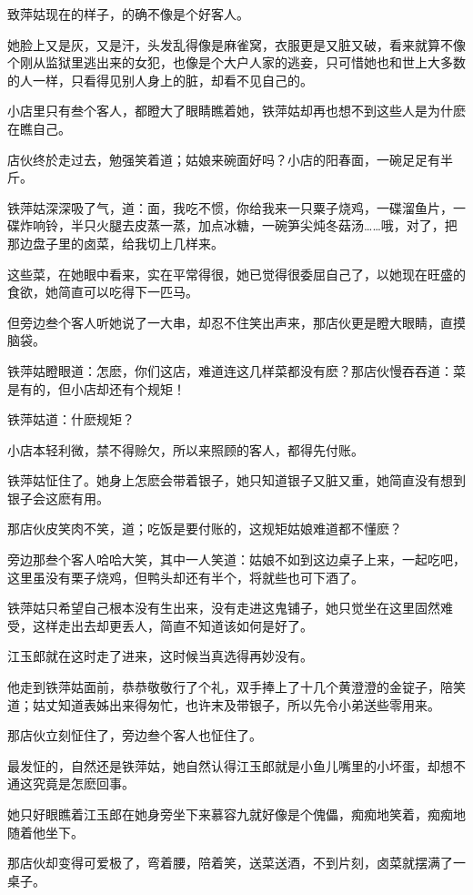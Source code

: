 \documentclass[12pt,oneside]{book}
\begin{document}
致萍姑现在的样子，的确不像是个好客人。

她脸上又是灰，又是汗，头发乱得像是麻雀窝，衣服更是又脏又破，看来就算不像个刚从监狱里逃出来的女犯，也像是个大户人家的逃妾，只可惜她也和世上大多数的人一样，只看得见别人身上的脏，却看不见自己的。

小店里只有叁个客人，都瞪大了眼睛瞧着她，铁萍姑却再也想不到这些人是为什麽在瞧自己。

店伙终於走过去，勉强笑着道；姑娘来碗面好吗？小店的阳春面，一碗足足有半斤。

铁萍姑深深吸了气，道：面，我吃不惯，你给我来一只粟子烧鸡，一碟溜鱼片，一碟炸响铃，半只火腿去皮蒸一蒸，加点冰糖，一碗笋尖炖冬菇汤\ldots\ldots 哦，对了，把那边盘子里的卤菜，给我切上几样来。

这些菜，在她眼中看来，实在平常得很，她已觉得很委屈自己了，以她现在旺盛的食欲，她简直可以吃得下一匹马。

但旁边叁个客人听她说了一大串，却忍不住笑出声来，那店伙更是瞪大眼睛，直摸脑袋。

铁萍姑瞪眼道：怎麽，你们这店，难道连这几样菜都没有麽？那店伙慢吞吞道：菜是有的，但小店却还有个规矩！

铁萍姑道：什麽规矩？

小店本轻利微，禁不得赊欠，所以来照顾的客人，都得先付账。

铁萍姑怔住了。她身上怎麽会带着银子，她只知道银子又脏又重，她简直没有想到银子会这麽有用。

那店伙皮笑肉不笑，道；吃饭是要付账的，这规矩姑娘难道都不懂麽？

旁边那叁个客人哈哈大笑，其中一人笑道：姑娘不如到这边桌子上来，一起吃吧，这里虽没有栗子烧鸡，但鸭头却还有半个，将就些也可下酒了。

铁萍姑只希望自己根本没有生出来，没有走进这鬼铺子，她只觉坐在这里固然难受，这样走出去却更丢人，简直不知道该如何是好了。

江玉郎就在这时走了进来，这时候当真选得再妙没有。

他走到铁萍姑面前，恭恭敬敬行了个礼，双手捧上了十几个黄澄澄的金锭子，陪笑道；姑丈知道表姊出来得匆忙，也许末及带银子，所以先令小弟送些零用来。

那店伙立刻怔住了，旁边叁个客人也怔住了。

最发怔的，自然还是铁萍姑，她自然认得江玉郎就是小鱼儿嘴里的小坏蛋，却想不通这究竟是怎麽回事。

她只好眼瞧着江玉郎在她身旁坐下来慕容九就好像是个傀儡，痴痴地笑着，痴痴地随着他坐下。

那店伙却变得可爱极了，弯着腰，陪着笑，送菜送酒，不到片刻，卤菜就摆满了一桌子。
\end{document}
